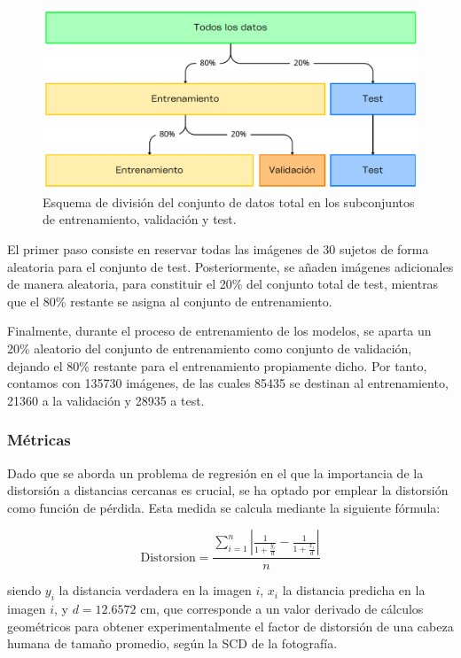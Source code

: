 \begin{figure}[H]
	\centering
	\includegraphics[scale=0.55]{imagenes/cap5/hold-out.png}
	\caption[Esquema de división del conjunto de datos.]{Esquema de división del conjunto de datos total en los subconjuntos de entrenamiento, validación y test.}
	\label{fig27}
\end{figure}

El primer paso consiste en reservar todas las imágenes de 30 sujetos de forma aleatoria para el conjunto de test. Posteriormente, se añaden imágenes adicionales de manera aleatoria, para constituir el 20\% del conjunto total de test, mientras que el 80\% restante se asigna al conjunto de entrenamiento.

Finalmente, durante el proceso de entrenamiento de los modelos, se aparta un 20\% aleatorio del conjunto de entrenamiento como conjunto de validación, dejando el 80\% restante para el entrenamiento propiamente dicho. Por tanto, contamos con 135730 imágenes, de las cuales 85435 se destinan al entrenamiento, 21360 a la validación y 28935 a test.


\subsubsection{Métricas}

Dado que se aborda un problema de regresión en el que la importancia de la distorsión a distancias cercanas es crucial, se ha optado por emplear la distorsión como función de pérdida. Esta medida se calcula mediante la siguiente fórmula:

\begin{equation}
	\text{Distorsion} = \displaystyle \frac{\sum_{i=1}^{n} | \displaystyle \frac{1}{1 + \displaystyle \frac{y_i}{d}} - \displaystyle \frac{1}{1 + \displaystyle \frac{x_i}{d}}|}{n}
\end{equation}

siendo $y_i$ la distancia verdadera en la imagen $i$, $x_i$ la distancia predicha en la imagen $i$, y $d = 12.6572 $ cm, que corresponde a un valor derivado de cálculos geométricos \cite{55} para obtener experimentalmente el factor de distorsión de una cabeza humana de tamaño promedio, según la SCD de la fotografía.

